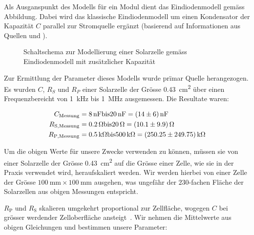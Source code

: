Als  Ausganspunkt  des  Modells  f\"ur ein  Modul  dient  das  Eindiodenmodell
   gem\"ass  Abbildung. Dabei   wird  das
klassische   Eindiodenmodell  um   einen  Kondensator   der  Kapazit\"at   $C$
parallel zur  Stromquelle erg\"anzt  (basierend auf Informationen  aus Quellen
\cite{ref:solar:scofield} und \cite{ref:solar:friesen}).

\begin{figure}[h!tb]
    \centering
    
    \caption{%
        Schaltschema    zur    Modellierung    einer    Solarzelle    gem\"ass
        Eindiodenmodell mit zus\"atzlicher Kapazit\"at%
    }
    \label{fig:circuit:solarCell}
\end{figure}

Zur   Ermittlung  der   Parameter   dieses  Modells   wurde  pr\"imar   Quelle
\cite{ref:solar:scofield}  herangezogen. Es wurden  $C$,  $R_{S}$ und  $R_{P}$
einer   Solarzelle   der   Gr\"osse   \SI{0.43}{\centi\meter\squared}   \"uber
einen   Frequenzbereicht  von   \SI{1}{\kilo\hertz}  bis   \SI{1}{\mega\hertz}
ausgemessen. Die Resultate waren:

\begin{align}
    C_{\mathrm{Messung}}    &= \SI{8}{\nano\farad} \text{bis} \SI{20}{\nano\farad}  = \SI{14 \pm 6}{\nano\farad} \\
    R_{\mathrm{S, Messung}} &= \SI{0.2}{\ohm}      \text{bis} \SI{20}{\ohm}         = \SI{10.1 \pm 9.9}{\ohm}     \\
    R_{\mathrm{P, Messung}} &= \SI{0.5}{\kilo\ohm} \text{bis} \SI{500}{\kilo\ohm}   = \SI{250.25 \pm 249.75}{\kilo\ohm}
\end{align}

Um  die obigen  Werte  f\"ur  unsere Zwecke  verwenden  zu k\"onnen,  m\"ussen
sie   von  einer   Solarzelle  der   Gr\"osse  \SI{0.43}{\centi\meter\squared}
auf   die  Gr\"osse   einer   Zelle,   wie  sie   in   der  Praxis   verwendet
wird,  heraufskaliert   werden. Wir  werden   hierbei  von  einer   Zelle  der
Gr\"osse $\SI{100}{\milli\meter} \times  \SI{100}{\milli\meter}$ ausgehen, was
ungef\"ahr  der $230$-fachen  Fl\"ache  der Solarzellen  aus obigen  Messungen
entspricht.

$R_{\mathrm{P}}$   und  $R_{\mathrm{S}}$   skalieren  umgekehrt   proportional
zur  Zellfl\"ache,  wogegen  $C$   bei  gr\"osser  werdender  Zelloberfl\"ache
ansteigt~\cite{ref:solar:scofield}. Wir  nehmen  die  Mittelwerte  aus  obigen
Gleichungen und bestimmen unsere Parameter:

